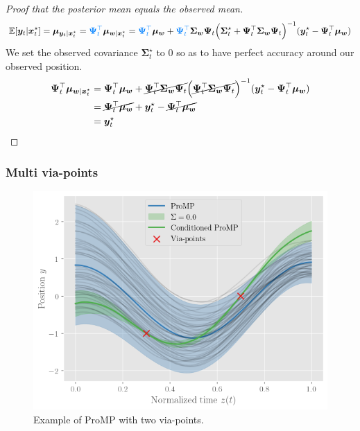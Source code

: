 \documentclass{article}
\begin{document}
\begin{proof}[Proof that the posterior mean equals the observed mean]
\begin{equation}
  \E[\bm{y}_{t}|\bm{x}_{t}^{\star}] = \bm{\mu}_{\bm{y}_{t}|\bm{x}_{t}^{\star}} = \textcolor[rgb]{0,0.5,1}{\bm{\Psi}_t^\top} \bm{\mu}_{\bm{w}|\bm{x}_t^\star} = \textcolor[rgb]{0,0.5,1}{\bm{\Psi}_t^\top} \bm{\mu_w} + \textcolor[rgb]{0,0.5,1}{\bm{\Psi}_t^\top} \bm{\Sigma_w}\bm{\Psi}_t \Big(\bm{\Sigma}_t^\star + \bm{\Psi}_t^\top \bm{\Sigma_w}\bm{\Psi}_t \Big)^{-1} (\bm{y}_t^\star - \bm{\Psi}_t^\top \bm{\mu_w})
  \end{equation}
  We set the observed covariance $\bm{\Sigma}_t^\star$ to $0$ so as to have perfect accuracy around our observed position.
\begin{align}
  \bm{\Psi}_t^\top \bm{\mu}_{\bm{w}|\bm{x}_t^\star} &= \bm{\Psi}_t^\top \bm{\mu_w} + \cancel{\bm{\Psi}_t^\top \bm{\Sigma_w}\bm{\Psi}_t} \Big( \cancel{\bm{\Psi}_t^\top \bm{\Sigma_w}\bm{\Psi}_t} \Big)^{-1} (\bm{y}_t^\star - \bm{\Psi}_t^\top \bm{\mu_w})\\
                                   &= \cancel{\bm{\Psi}_t^\top \bm{\mu_w}} + \bm{y}_t^\star - \cancel{\bm{\Psi}_t^\top \bm{\mu_w}}\\
                                   &= \bm{y}_t^\star
  \end{align}
  \end{proof}

  \subsubsection{Multi via-points}

\begin{figure}[htbp]
  \centering
  \includegraphics[width=0.5\linewidth]{fig/2-via-points.png}
  \caption{Example of ProMP with two via-points.}
  \label{fig:multi-via-pts}
\end{figure}
\end{document}
